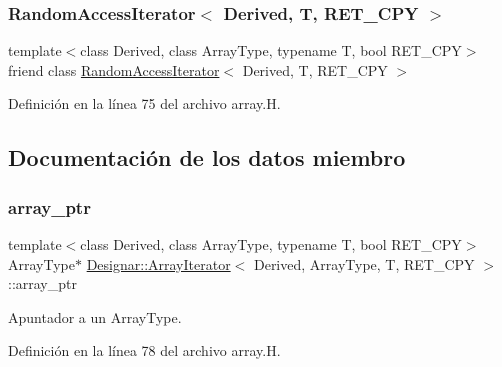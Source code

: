 \subsubsection{\texorpdfstring{Random\+Access\+Iterator$<$ Derived, T, R\+E\+T\+\_\+\+C\+P\+Y $>$}{RandomAccessIterator< Derived, T, RET\_CPY >}}
{\footnotesize\ttfamily template$<$class Derived, class Array\+Type, typename T, bool R\+E\+T\+\_\+\+C\+PY$>$ \\
friend class \hyperlink{class_designar_1_1_random_access_iterator}{Random\+Access\+Iterator}$<$ Derived, T, R\+E\+T\+\_\+\+C\+PY $>$\hspace{0.3cm}{\ttfamily [friend]}}



Definición en la línea 75 del archivo array.\+H.



\subsection{Documentación de los datos miembro}
\mbox{\label{class_designar_1_1_array_iterator_a6518c265f47bf58f4e2c04b55416ded6}} 
\subsubsection{\texorpdfstring{array\+\_\+ptr}{array\_ptr}}
{\footnotesize\ttfamily template$<$class Derived, class Array\+Type, typename T, bool R\+E\+T\+\_\+\+C\+PY$>$ \\
Array\+Type$\ast$ \hyperlink{class_designar_1_1_array_iterator}{Designar\+::\+Array\+Iterator}$<$ Derived, Array\+Type, T, R\+E\+T\+\_\+\+C\+PY $>$\+::array\+\_\+ptr\hspace{0.3cm}{\ttfamily [protected]}}



Apuntador a un Array\+Type. 



Definición en la línea 78 del archivo array.\+H.

\mbox{\label{class_designar_1_1_array_iterator_aef9cd548a0423017eb452081f260a840}} 
